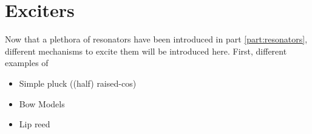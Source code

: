 \chapter*{Exciters}
Now that a plethora of resonators have been introduced in part \ref{part:resonators}, different mechanisms to excite them will be introduced here. First, different examples of 

\begin{itemize}
    \item Simple pluck ((half) raised-cos)
    \item Bow Models
    \item Lip reed
\end{itemize}